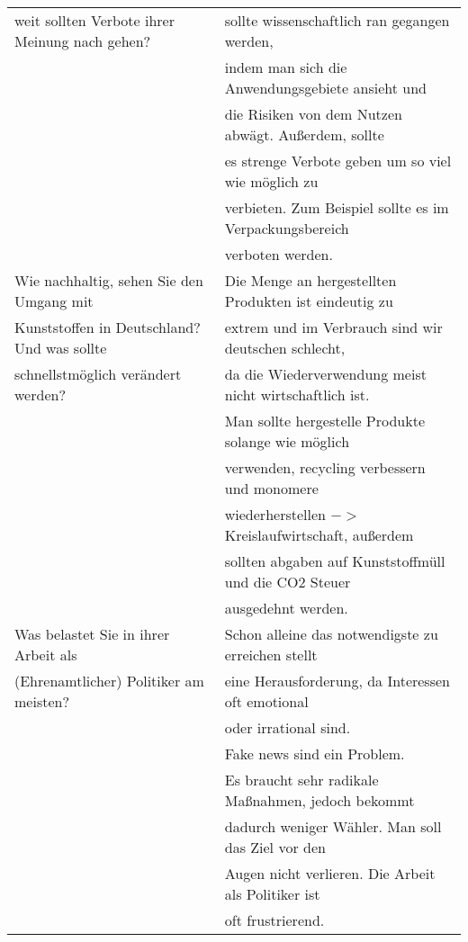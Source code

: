 \begin{tabular} [h]{l|l}
weit sollten Verbote ihrer Meinung nach gehen? &sollte wissenschaftlich ran gegangen werden,\\
&indem man sich die Anwendungsgebiete ansieht und \\
&die Risiken von dem Nutzen abwägt. Außerdem, sollte \\
&es strenge Verbote geben um so viel wie möglich zu \\
&verbieten. Zum Beispiel sollte es im Verpackungsbereich\\
&verboten werden.\\
\hline
Wie nachhaltig, sehen Sie den Umgang mit &Die Menge an hergestellten Produkten ist eindeutig zu \\
Kunststoffen in Deutschland? Und was sollte &extrem und im Verbrauch sind wir deutschen schlecht,\\
schnellstmöglich verändert werden? &da die Wiederverwendung meist nicht wirtschaftlich ist.\\
&Man sollte hergestelle Produkte solange wie möglich \\
&verwenden, recycling verbessern und monomere\\
& wiederherstellen $->$ Kreislaufwirtschaft, außerdem \\
&sollten abgaben auf Kunststoffmüll und die CO2 Steuer\\
& ausgedehnt werden.\\
\hline
Was belastet Sie in ihrer Arbeit als &Schon alleine das notwendigste zu erreichen stellt\\
(Ehrenamtlicher) Politiker am meisten?&eine Herausforderung, da Interessen oft emotional\\
&oder irrational sind.\\
&Fake news sind ein Problem.\\
&Es braucht sehr radikale Maßnahmen, jedoch bekommt\\
&dadurch weniger Wähler. Man soll das Ziel vor den\\
&Augen nicht verlieren. Die Arbeit als Politiker ist\\
&oft frustrierend.\\



\end{tabular}
